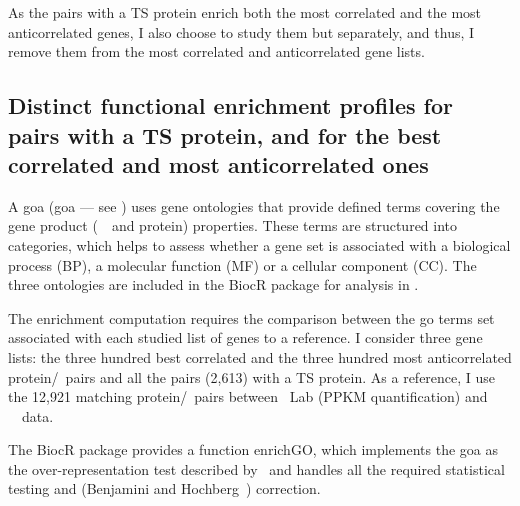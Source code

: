 As the pairs with a \gls{TS} protein enrich both the most correlated
and the most anticorrelated genes,
I also choose to study them but separately,
and thus,
I remove them from the most correlated and anticorrelated gene lists.\mybr\

\vspace{-4mm}
\subsection{Distinct functional enrichment profiles
for pairs with a TS protein,
and for the best correlated and most anticorrelated ones}
\vspace{-2mm}

A \glsdesc{goa} (\gls{goa} --- see )
uses gene ontologies that provide defined terms
covering the gene product (\ie\ \mRNA\ and protein) properties.
These terms are structured into categories,
which helps to assess whether a gene set is associated with
a biological process (BP), a molecular function (MF) or a cellular component (CC).
The three ontologies are included
in the \gls{BiocR} package 
for analysis in .\mybr\

The enrichment computation requires
the comparison between the \gls{go} terms set associated
with each studied list of genes to a reference.
I consider three gene lists:
the three hundred best correlated and
the three hundred most anticorrelated protein/\mRNA\ pairs
and all the pairs (2,613) with a \gls{TS} protein.
As a reference, I use the 12,921 matching protein/\mRNA\ pairs
between \pandey\ Lab (\gls{PPKM} quantification) and \uhlen\ \etal\ data.\mybr\

The \gls{BiocR} package 
provides a function \textsf{enrichGO},
which implements the \gls{goa} as the over-representation test
described by~\citet{Boyle2004-dh}
and handles all the required statistical testing
and (Benjamini and Hochberg~) correction.\mybr\

